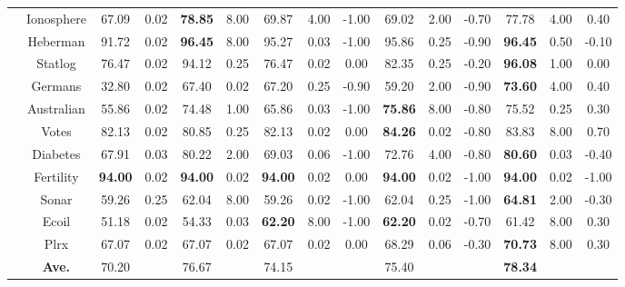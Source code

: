 \documentclass[journal,12pn, onecolumn]{IEEEtran}
\begin{document}
{{{\begin{table}
{{\begin{tabular}{ccccccccccccccc}
          & Ionosphere & 67.09  & 0.02  & \textbf{78.85}  & 8.00  & 69.87  & 4.00  & -1.00  & 69.02  & 2.00  & -0.70  & 77.78  & 4.00  & 0.40  \\
          & Heberman & 91.72  & 0.02  & \textbf{96.45}  & 8.00  & 95.27  & 0.03  & -1.00  & 95.86  & 0.25  & -0.90  & \textbf{96.45}  & 0.50  & -0.10  \\
          & Statlog & 76.47  & 0.02  & 94.12  & 0.25  & 76.47  & 0.02  & 0.00  & 82.35  & 0.25  & -0.20  & \textbf{96.08}  & 1.00  & 0.00  \\
          & Germans & 32.80  & 0.02  & 67.40  & 0.02  & 67.20  & 0.25  & -0.90  & 59.20  & 2.00  & -0.90  & \textbf{73.60}  & 4.00  & 0.40  \\
          & Australian & 55.86  & 0.02  & 74.48  & 1.00  & 65.86  & 0.03  & -1.00  & \textbf{75.86}  & 8.00  & -0.80  & 75.52  & 0.25  & 0.30  \\
          & Votes & 82.13  & 0.02  & 80.85  & 0.25  & 82.13  & 0.02  & 0.00  & \textbf{84.26}  & 0.02  & -0.80  & 83.83  & 8.00  & 0.70  \\
          & Diabetes & 67.91  & 0.03  & 80.22  & 2.00  & 69.03  & 0.06  & -1.00  & 72.76  & 4.00  & -0.80  & \textbf{80.60}  & 0.03  & -0.40  \\
          & Fertility & \textbf{94.00}  & 0.02  & \textbf{94.00}  & 0.02  & \textbf{94.00}  & 0.02  & 0.00  & \textbf{94.00}  & 0.02  & -1.00  & \textbf{94.00}  & 0.02  & -1.00  \\
          & Sonar & 59.26  & 0.25  & 62.04  & 8.00  & 59.26  & 0.02  & -1.00  & 62.04  & 0.25  & -1.00  & \textbf{64.81}  & 2.00  & -0.30  \\
          & Ecoil & 51.18  & 0.02  & 54.33  & 0.03  & \textbf{62.20}  & 8.00  & -1.00  & \textbf{62.20}  & 0.02  & -0.70  & 61.42  & 8.00  & 0.30  \\
          & Plrx  & 67.07  & 0.02  & 67.07  & 0.02  & 67.07  & 0.02  & 0.00  & 68.29  & 0.06  & -0.30  & \textbf{70.73}  & 8.00  & 0.30  \\
\cmidrule{2-15}          & \textbf{Ave. } & 70.20  &       & 76.67  &       & 74.15  &       &       & 75.40  &       &       & \textbf{78.34}  &       &  \\
    \bottomrule
    \end{tabular}}}%
    \label{ucin}
\end{table}%

}}}
\end{document}

